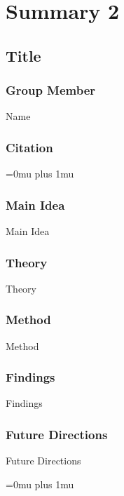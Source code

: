 \section{Summary 2}

\noindent
\subsection{Title}

\subsubsection{Group Member}

\noindent
Name

\noindent
\subsubsection{Citation}

\Urlmuskip=0mu plus 1mu\relax
{}

\subsubsection{Main Idea}

\noindent
Main Idea

\subsubsection{Theory}

\noindent
Theory

\subsubsection{Method}

\noindent
Method

\subsubsection{Findings}

\noindent
Findings

\subsubsection{Future Directions}

\noindent
Future Directions

\Urlmuskip=0mu plus 1mu\relax

\pagebreak